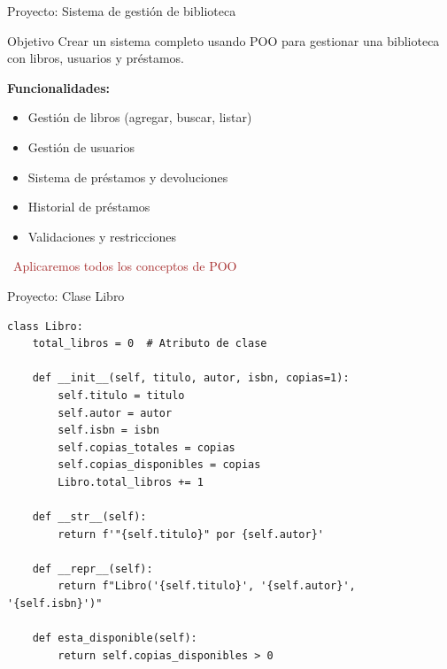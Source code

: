 \documentclass{beamer}
\begin{document}
\begin{frame}{Proyecto: Sistema de gestión de biblioteca \faBook}
\begin{conceptbox}{Objetivo}
Crear un sistema completo usando POO para gestionar una biblioteca con libros, usuarios y préstamos.
\end{conceptbox}

\textbf{Funcionalidades:}
\small
\begin{itemize}
    \item[\faBook] Gestión de libros (agregar, buscar, listar)
    \item[\faUser] Gestión de usuarios
    \item[\faExchangeAlt] Sistema de préstamos y devoluciones
    \item[\faHistory] Historial de préstamos
    \item[\faCheckCircle] Validaciones y restricciones
\end{itemize}

\vspace{0.2cm}
\begin{center}
\textcolor{brown}{\faLightbulb\ Aplicaremos todos los conceptos de POO}
\end{center}
\end{frame}

\begin{frame}[fragile]{Proyecto: Clase Libro \faBook}
\begin{lstlisting}
class Libro:
    total_libros = 0  # Atributo de clase
    
    def __init__(self, titulo, autor, isbn, copias=1):
        self.titulo = titulo
        self.autor = autor
        self.isbn = isbn
        self.copias_totales = copias
        self.copias_disponibles = copias
        Libro.total_libros += 1
    
    def __str__(self):
        return f'"{self.titulo}" por {self.autor}'
    
    def __repr__(self):
        return f"Libro('{self.titulo}', '{self.autor}', '{self.isbn}')"
    
    def esta_disponible(self):
        return self.copias_disponibles > 0
\end{lstlisting}
\end{frame}
\end{document}
